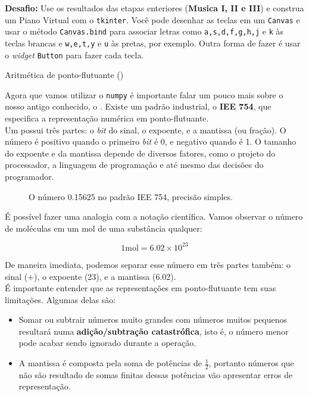 \documentclass[12pt]{article}
\begin{document}
	
	
	\textbf{Desafio:} Use os resultados das etapas enteriores (\textbf{Musica I, II e III}) e construa um Piano Virtual com o \texttt{tkinter}. Você pode desenhar as teclas em um \texttt{Canvas} e usar o método \texttt{Canvas.bind} para associar letras como \texttt{a,s,d,f,g,h,j} e \texttt{k} às teclas brancas e \texttt{w,e,t,y} e \texttt{u} às pretas, por exemplo. Outra forma de fazer é usar o \textit{widget} \texttt{Button} para fazer cada tecla.


	\problem[1]{}

	\begin{interlude}{Aritmética de ponto-flutuante ()}
	
	Agora que vamos utilizar o \texttt{numpy} é importante falar um pouco mais sobre o nosso antigo conhecido, o . Existe um padrão industrial, o \textbf{IEE 754}, que especifica a representação numérica em ponto-flutuante.\\
	
	Um  possui três partes:	o \textit{bit} do sinal, o expoente, e a mantissa (ou fração). O número é positivo quando o primeiro \textit{bit} é 0, e negativo quando é 1. O tamanho do expoente e da mantissa depende de diversos fatores, como o projeto do processador, a linguagem de programação e até mesmo das decisões do programador.
	
	\begin{figure}[H]
	\centering
	\small
	  
	\caption{O número 0.15625 no padrão IEE 754, precisão simples.}
	\end{figure}
	
	É possível fazer uma analogia com a notação científica. Vamos observar o número de moléculas em um mol de uma substância qualquer:
	
		$$1 \text{mol} = 6.02 \times 10^{23}$$

	De maneira imediata, podemos separar esse número em três partes também: o sinal ($+$), o expoente (23), e a mantissa (6.02).\\
	
	É importante entender que as representações em ponto-flutuante tem suas limitações. Algumas delas são:
	
	\begin{itemize}
	\item Somar ou subtrair números muito grandes com números muitos pequenos resultará numa \textbf{adição/subtração catastrófica}, isto é, o número menor pode acabar sendo ignorado durante a operação.
	
	\item A mantissa é composta pela soma de potências de $\frac{1}{2}$, portanto números que não são resultado de somas finitas dessas potências vão apresentar erros de representação.
	\end{itemize}
	
	\end{interlude}
	
\end{document}
